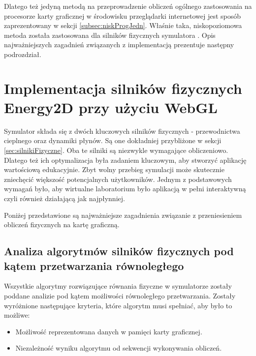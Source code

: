 Dlatego też jedyną metodą na przeprowadzenie obliczeń ogólnego zastosowania na
procesorze karty graficznej w środowisku przeglądarki internetowej jest sposób
zaprezentowany w sekcji \ref{subsec:niskProgJedn}. Właśnie taka,
niskopoziomowa metoda została zastosowana dla silników fizycznych symulatora
. Opis najważniejszych zagadnień związanych z implementacją
prezentuje następny podrozdział.

\section{Implementacja silników fizycznych Energy2D przy użyciu WebGL}
\label{sec:implSilFizWebGL}

Symulator  składa się z dwóch kluczowych silników fizycznych -
przewodnictwa cieplnego oraz dynamiki płynów. Są one dokładniej przybliżone w
sekcji \ref{sec:silnikiFizyczne}. Oba te silniki są niezwykle wymagające
obliczeniowo. Dlatego też ich optymalizacja była zadaniem kluczowym, aby
stworzyć aplikację wartościową edukacyjnie. Zbyt wolny przebieg symulacji może
skutecznie zniechęcić większość potencjalnych użytkowników. Jednym z
podstawowych wymagań było, aby wirtualne laboratorium było aplikacją w pełni
interaktywną czyli również działającą jak najpłynniej.

Poniżej przedstawione są najważniejsze zagadnienia związanie z przeniesieniem
obliczeń fizycznych  na kartę graficzną.

\subsection{Analiza algorytmów silników fizycznych pod kątem przetwarzania
równoległego}  

Wszystkie algorytmy rozwiązujące równania fizyczne w symulatorze 
zostały poddane analizie pod kątem możliwości równoległego przetwarzania.
Zostały wyróżnione następujące kryteria, które algorytm musi spełniać, aby było
to możliwe:

\begin{itemize}

\item Możliwość reprezentowana danych w pamięci karty graficznej.

\item Niezależność wyniku algorytmu od sekwencji wykonywania obliczeń.

\end{itemize}

